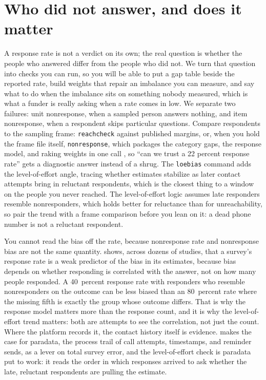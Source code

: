 \documentclass[
    a4paper,
    fontsize=10pt,
    twoside=true,
    numbers=noenddot,
]{kaobook}
\begin{document}
\section{Who did not answer, and does it matter}
A response rate is not a verdict on its own; the real question is whether the people who answered differ from the people who did not. We turn that question into checks you can run, so you will be able to put a gap table beside the reported rate, build weights that repair an imbalance you can measure, and say what to do when the imbalance sits on something nobody measured, which is what a funder is really asking when a rate comes in low. We separate two failures: unit nonresponse, when a sampled person answers nothing, and item nonresponse, when a respondent skips particular questions. Compare respondents to the sampling frame: \texttt{reachcheck} against published margins, or, when you hold the frame file itself, \texttt{nonresponse}, which packages the category gaps, the response model, and raking weights in one call \parencite{groves2008nonresponse}, so \enquote{can we trust a 22 percent response rate} gets a diagnostic answer instead of a shrug. The \texttt{loebias} command adds the level-of-effort angle, tracing whether estimates stabilize as later contact attempts bring in reluctant respondents, which is the closest thing to a window on the people you never reached. The level-of-effort logic assumes late responders resemble nonresponders, which holds better for reluctance than for unreachability, so pair the trend with a frame comparison before you lean on it: a dead phone number is not a reluctant respondent.

You cannot read the bias off the rate, because nonresponse rate and nonresponse bias are not the same quantity. \textcite{groves2006nonresponse} shows, across dozens of studies, that a survey's response rate is a weak predictor of the bias in its estimates, because bias depends on whether responding is correlated with the answer, not on how many people responded. A 40~percent response rate with responders who resemble nonresponders on the outcome can be less biased than an 80~percent rate where the missing fifth is exactly the group whose outcome differs. That is why the response model matters more than the response count, and it is why the level-of-effort trend matters: both are attempts to see the correlation, not just the count. Where the platform records it, the contact history itself is evidence. \textcite{kreuter2013paradata} makes the case for paradata, the process trail of call attempts, timestamps, and reminder sends, as a lever on total survey error, and the level-of-effort check is paradata put to work: it reads the order in which responses arrived to ask whether the late, reluctant respondents are pulling the estimate.
\end{document}
